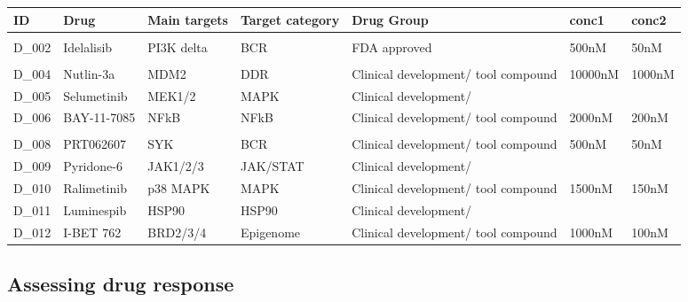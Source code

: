 \documentclass[11pt, a4paper, twosided]{book}
\begin{document}
\begin{table}
\centering\begingroup\fontsize{7}{9}\selectfont
\begin{tabular}{l|l|l|l|l|l|l}
\hline
\textbf{ID} & \textbf{Drug} & \textbf{Main targets} & \textbf{Target category} & \textbf{Drug Group} & \textbf{conc1} & \textbf{conc2}\\
\hline
\cellcolor[HTML]{E2E868}{D\_001} & \cellcolor[HTML]{E2E868}{Ibrutinib} & \cellcolor[HTML]{E2E868}{BTK} & \cellcolor[HTML]{E2E868}{BCR} & \cellcolor[HTML]{E2E868}{FDA approved} & \cellcolor[HTML]{E2E868}{500nM} & \cellcolor[HTML]{E2E868}{50nM}\\
\hline
D\_002 & Idelalisib & PI3K delta & BCR & FDA approved & 500nM & 50nM\\
\hline
\cellcolor[HTML]{E2E868}{D\_003} & \cellcolor[HTML]{E2E868}{Fludarabine} & \cellcolor[HTML]{E2E868}{Purine analogue} & \cellcolor[HTML]{E2E868}{DDR} & \cellcolor[HTML]{E2E868}{FDA approved} & \cellcolor[HTML]{E2E868}{2000nM} & \cellcolor[HTML]{E2E868}{200nM}\\
\hline
D\_004 & Nutlin-3a & MDM2 & DDR & Clinical development/
tool compound & 10000nM & 1000nM\\
\hline
D\_005 & Selumetinib & MEK1/2 & MAPK & Clinical development/
\cellcolor[HTML]{E2E868}{tool compound} & \cellcolor[HTML]{E2E868}{1000nM} & \cellcolor[HTML]{E2E868}{\vphantom{1} 100nM}\\
\hline
D\_006 & BAY-11-7085 & NFkB & NFkB & Clinical development/
tool compound & 2000nM & 200nM\\
\hline
\cellcolor[HTML]{E2E868}{D\_007} & \cellcolor[HTML]{E2E868}{Everolimus} & \cellcolor[HTML]{E2E868}{mTOR} & \cellcolor[HTML]{E2E868}{mTOR} & \cellcolor[HTML]{E2E868}{FDA approved} & \cellcolor[HTML]{E2E868}{500nM} & \cellcolor[HTML]{E2E868}{50nM}\\
\hline
D\_008 & PRT062607 & SYK & BCR & Clinical development/
tool compound & 500nM & \vphantom{1} 50nM\\
\hline
D\_009 & Pyridone-6 & JAK1/2/3 & JAK/STAT & Clinical development/
\cellcolor[HTML]{E2E868}{tool compound} & \cellcolor[HTML]{E2E868}{500nM} & \cellcolor[HTML]{E2E868}{50nM}\\
\hline
D\_010 & Ralimetinib & p38 MAPK & MAPK & Clinical development/
tool compound & 1500nM & 150nM\\
\hline
D\_011 & Luminespib & HSP90 & HSP90 & Clinical development/
\cellcolor[HTML]{E2E868}{tool compound} & \cellcolor[HTML]{E2E868}{200nM} & \cellcolor[HTML]{E2E868}{20nM}\\
\hline
D\_012 & I-BET 762 & BRD2/3/4 & Epigenome & Clinical development/
tool compound & 1000nM & 100nM\\
\hline
\end{tabular}
\endgroup{}
\end{table}
\hypertarget{assessing-drug-response}{%
\subsection{Assessing drug response}\label{assessing-drug-response}}
\end{document}
